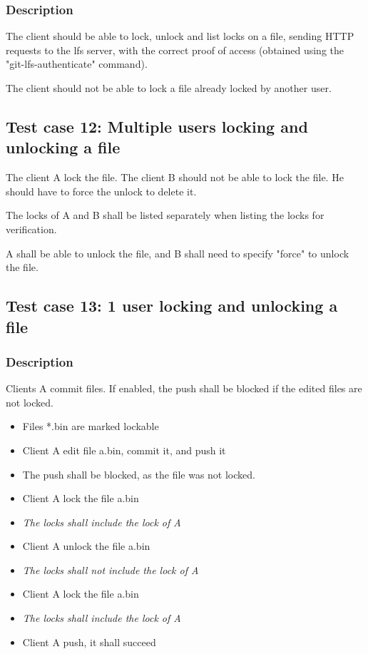 \subsubsection{Description}

The client should be able to lock, unlock and list locks on a file, sending HTTP requests to the lfs server, with the correct proof of access (obtained using the "git-lfs-authenticate" command).

The client should not be able to lock a file already locked by another user.

\subsection{Test case 12: Multiple users locking and unlocking a file}

The client A lock the file. The client B should not be able to lock the file. He should have to force the unlock to delete it. 

The locks of A and B shall be listed separately when listing the locks for verification. 

A shall be able to unlock the file, and B shall need to specify "force" to unlock the file.

\subsection{Test case 13: 1 user locking and unlocking a file}

\subsubsection{Description}

Clients A commit files. If enabled, the push shall be blocked if the edited files are not locked. 

\begin{itemize}
    \item Files *.bin are marked lockable
    \item Client A edit file a.bin, commit it, and push it
    \item The push shall be blocked, as the file was not locked.
    \item Client A lock the file a.bin
    \item \textit{The locks shall include the lock of A}
    \item Client A unlock the file a.bin
    \item \textit{The locks shall not include the lock of A}
    \item Client A lock the file a.bin
    \item \textit{The locks shall include the lock of A} 
    \item Client A push, it shall succeed
\end{itemize}

